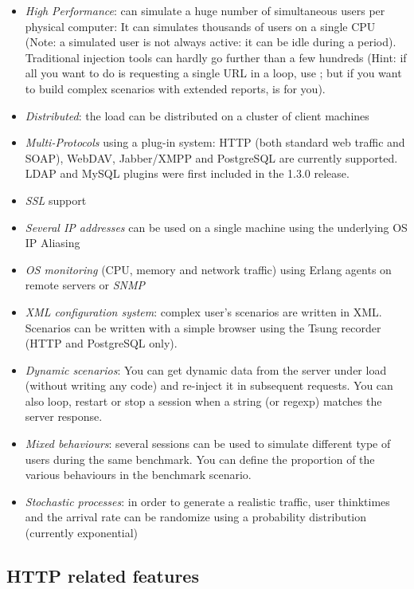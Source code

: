 \documentclass{TSUNG-en}
\begin{document}
\begin{itemize}
\item \emph{High Performance}:  can simulate a
  huge number of simultaneous users per physical computer: It can
  simulates thousands of users on a single CPU (Note: a simulated user
  is not always active: it can be idle during a 
  period). Traditional injection tools can hardly go further than a
  few hundreds (Hint: if all you want to do is requesting a single URL
  in a loop, use ; but if you want to build complex
  scenarios with extended reports,  is for you).
\item \emph{Distributed}: the load can be distributed on a cluster of
client machines
\item \emph{Multi-Protocols} using a plug-in system: HTTP (both standard
web traffic and SOAP),  WebDAV, Jabber/XMPP and PostgreSQL are currently
supported. LDAP and MySQL plugins were first included in the 1.3.0 release.
\item \emph{SSL} support
\item \emph{Several IP addresses} can be used on a single machine using
the underlying OS IP Aliasing
\item \emph{OS monitoring} (CPU, memory and network traffic) using Erlang
agents on remote servers or \emph{SNMP}
\item \emph{XML configuration system}: complex user's scenarios are written
  in XML. Scenarios can be written with a simple browser using the
  Tsung recorder (HTTP and PostgreSQL only).
\item \emph{Dynamic scenarios}: You can get dynamic data from the
  server under load (without writing any code) and re-inject it in
  subsequent requests. You can also loop, restart or stop a
  session when a string (or regexp) matches the server response.
\item \emph{Mixed behaviours}: several sessions can be used to simulate
different type of users during the same benchmark. You can define
the proportion of the various behaviours in the benchmark scenario.
\item \emph{Stochastic processes}: in order to generate a realistic traffic,
user thinktimes and the arrival rate can be randomize using a probability
distribution (currently exponential)
\end{itemize}

\subsection{HTTP related features}
\end{document}
